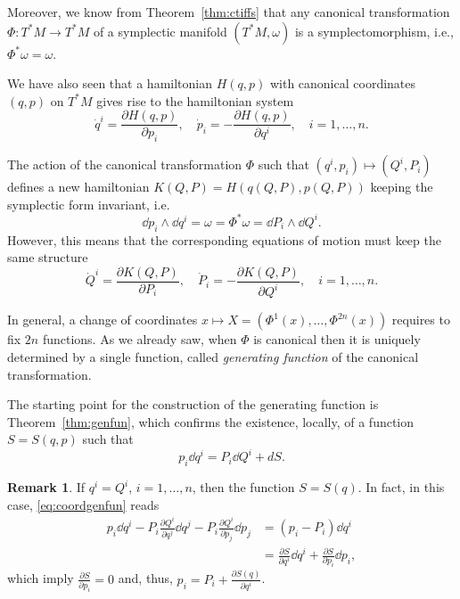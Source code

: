 \documentclass[english,fontsize=11pt,paper=b5]{scrbook}
\numberwithin{equation}{chapter}
\theoremstyle{definition}
\newtheorem{remark}{Remark}[chapter]
\begin{document}
    Moreover, we know from Theorem~\ref{thm:ctiffs} that any canonical transformation $\Phi:T^*M\to T^*M$ of a symplectic manifold $(T^*M,\omega)$ is a symplectomorphism, i.e., $\Phi^* \omega = \omega$.

    We have also seen that a hamiltonian $H(q,p)$ with canonical coordinates $(q,p)$ on $T^*M$ gives rise to the hamiltonian system
    \begin{equation}
      \dot q^i = \frac{\partial H(q,p)}{\partial p_i},\quad
      \dot p_i = -\frac{\partial H(q,p)}{\partial q^i},\quad
      i=1,\ldots,n.
    \end{equation}

    The action of the canonical transformation $\Phi$ such that $(q^i, p_i) \mapsto (Q^i, P_i)$ defines a new hamiltonian $K(Q,P) = H(q(Q,P), p(Q,P))$ keeping the symplectic form invariant, i.e.
    \begin{equation}
      \dd p_i \wedge \dd q^i = \omega = \Phi^* \omega = \dd P_i \wedge \dd Q^i.
    \end{equation}
    However, this means that the corresponding equations of motion must keep the same structure
    \begin{equation}
      \dot Q^i = \frac{\partial K(Q,P)}{\partial P_i},\quad
      \dot P_i = -\frac{\partial K(Q,P)}{\partial Q^i},\quad
      i=1,\ldots,n.
    \end{equation}

    In general, a change of coordinates $x\mapsto X=(\Phi^1(x), \ldots, \Phi^{2n}(x))$ requires to fix $2n$ functions.
    As we already saw, when $\Phi$ is canonical then it is uniquely determined by a single function, called \emph{generating function} of the canonical transformation.

    The starting point for the construction of the generating function is Theorem~\ref{thm:genfun}, which confirms the existence, locally, of a function $S=S(q,p)$ such that
    \begin{equation}\label{eq:coordgenfun}
      p_i \dd q^i = P_i \dd Q^i + dS.
    \end{equation}

    \begin{remark}
      If $q^i = Q^i$, $i=1,\ldots,n$, then the function $S=S(q)$. In fact, in this case, \eqref{eq:coordgenfun} reads
      \begin{align}
        p_i \dd q^i - P_i \frac{\partial Q^i}{\partial q^j}\dd q^j - P_i \frac{\partial Q^i}{\partial p_j}\dd p_j & = (p_i -P_i)\dd q^i                                                               \\
                                                                                                                  & = \frac{\partial S}{\partial q^i}\dd q^i + \frac{\partial S}{\partial p_i}\dd p_i,
      \end{align}
      which imply $\frac{\partial S}{\partial p_i} = 0$ and, thus, $p_i = P_i + \frac{\partial S(q)}{\partial q^i}$.
    \end{remark}
\end{document}
